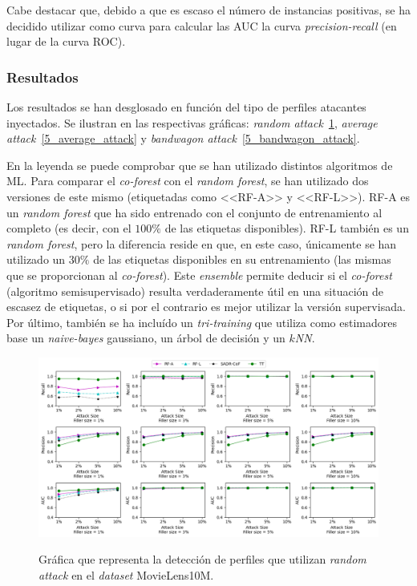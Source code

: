 Cabe destacar que, debido a que es escaso el número de instancias positivas, se ha decidido utilizar como curva para calcular las AUC la curva \textit{precision-recall} (en lugar de la curva ROC).

\subsubsection{Resultados}

Los resultados se han desglosado en función del tipo de perfiles atacantes inyectados. Se ilustran en las respectivas gráficas: \textit{random attack}~\ref{5_random_attack}, \textit{average attack}~\ref{5_average_attack} y \textit{bandwagon attack}~\ref{5_bandwagon_attack}.

En la leyenda se puede comprobar que se han utilizado distintos algoritmos de ML. Para comparar el \textit{co-forest} con el \textit{random forest}, se han utilizado dos versiones de este mismo (etiquetadas como <<RF-A>> y <<RF-L>>). RF-A es un \textit{random forest} que ha sido entrenado con el conjunto de entrenamiento al completo (es decir, con el $100\%$ de las etiquetas disponibles). RF-L también es un \textit{random forest}, pero la diferencia reside en que, en este caso, únicamente se han utilizado un $30\%$ de las etiquetas disponibles en su entrenamiento (las mismas que se proporcionan al \textit{co-forest}). Este \textit{ensemble} permite deducir si el \textit{co-forest} (algoritmo semisupervisado) resulta verdaderamente útil en una situación de escasez de etiquetas, o si por el contrario es mejor utilizar la versión supervisada. Por último, también se ha incluído un \textit{tri-training} que utiliza como estimadores base un \textit{naive-bayes} gaussiano, un árbol de decisión y un \textit{$k$NN}.

\begin{figure}[h]
	\caption[\textit{Random attack}: detección.]{Gráfica que representa la detección de perfiles que utilizan \textit{random attack} en el \textit{dataset} MovieLens10M.}
	\centering
	\includegraphics[scale=0.45]{../img/memoria/5_resultados_random_attack}
	\label{5_random_attack}
\end{figure}

